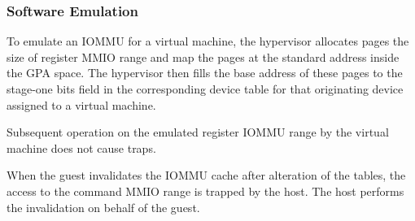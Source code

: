 \subsubsection{Software Emulation}

To emulate an IOMMU for a virtual machine, the hypervisor allocates pages the size of
register MMIO range and map the pages at the standard address inside the GPA space. The
hypervisor then fills the base address of these pages to the stage-one bits field in the
corresponding device table for that originating device assigned to a virtual machine.

Subsequent operation on the emulated register IOMMU range by the virtual machine does not
cause traps.

When the guest invalidates the IOMMU cache after alteration of the tables, the access to
the command MMIO range is trapped by the host. The host performs the invalidation on
behalf of the guest.

